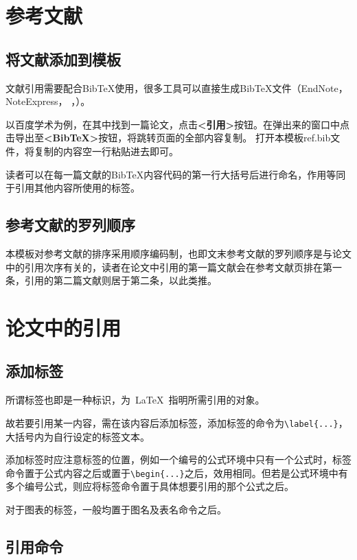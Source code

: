 \section{参考文献}

\subsection{将文献添加到模板}

文献引用需要配合BibTeX使用，很多工具可以直接生成BibTeX文件（EndNote， NoteExpress， ，）。\par 以百度学术为例，在其中找到一篇论文，点击\textbf{<引用>}按钮。在弹出来的窗口中点击导出至\textbf{<BibTeX>}按钮，将跳转页面的全部内容复制。 打开本模板ref.bib文件，将复制的内容空一行粘贴进去即可。

读者可以在每一篇文献的BibTeX内容代码的第一行大括号后进行命名，作用等同于引用其他内容所使用的标签。

\subsection{参考文献的罗列顺序}

本模板对参考文献的排序采用顺序编码制，也即文末参考文献的罗列顺序是与论文中的引用次序有关的，读者在论文中引用的第一篇文献会在参考文献页排在第一条，引用的第二篇文献则居于第二条，以此类推。

\section{论文中的引用}

\subsection{添加标签}

所谓标签也即是一种标识，为~\LaTeX~指明所需引用的对象。

故若要引用某一内容，需在该内容后添加标签，添加标签的命令为\verb|\label{...}|，大括号内为自行设定的标签文本。

添加标签时应注意标签的位置，例如一个编号的公式环境中只有一个公式时，标签命令置于公式内容之后或置于\verb|\begin{...}|之后，效用相同。但若是公式环境中有多个编号公式，则应将标签命令置于具体想要引用的那个公式之后。

对于图表的标签，一般均置于图名及表名命令之后。

\subsection{引用命令}

